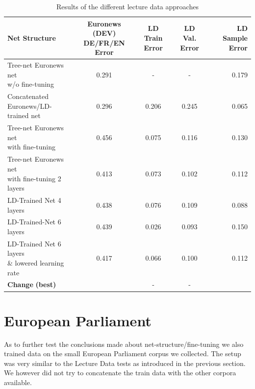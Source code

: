 \begin{table}
\caption{Results of the different lecture data approaches}
\label{tab:resultsLD}
\begin{tabular}{| l | c | c | c | r | }
	\hline
	\textbf{Net Structure} & \parbox[t]{2.5cm}{\textbf{Euronews (DEV)} \\ \textbf{DE/FR/EN Error}} & \parbox[t]{2.5cm}{\textbf{LD} \\ \textbf{Train Error}} & \parbox[t]{2.5cm}{\textbf{LD} \\ \textbf{Val. Error}} & \parbox[t]{2.5cm}{\textbf{LD} \\ \textbf{Sample Error}} \\
	\hline
	\parbox[t]{5cm}{Tree-net Euronews net \\
	 w/o fine-tuning}  & 0.291 & - & - & 0.179 \\
	\hline
	\parbox[t]{5cm}{Concatenated \\ Euronews/LD-trained net } & 0.296 & 0.206 & 0.245 & 0.065 \\
	\hdashline
	\parbox[t]{5cm}{Tree-net Euronews net \\ with fine-tuning } & 0.456 & 0.075 & 0.116 & 0.130 \\
	\hdashline
	\parbox[t]{5cm}{Tree-net Euronews net \\ with fine-tuning 2 layers } & 0.413 & 0.073 & 0.102 & 0.112 \\
	\hdashline
	\parbox[t]{5cm}{LD-Trained Net 4 layers} & 0.438 & 0.076 & 0.109 & 0.088 \\
	\hdashline
	LD-Trained-Net 6 layers & 0.439 & 0.026 & 0.093 & 0.150 \\
	\hdashline
	\parbox[t]{5cm}{LD-Trained Net 6 layers \\ \& lowered learning rate} & 0.417 & 0.066 & 0.100 & 0.112 \\
	\hline
	\parbox[t]{5cm}{\textbf{Change} \textbf{(best)}} &  & - & - &  \\
	\hline
\end{tabular}
\end{table}

\section{European Parliament}
\label{sec:EP}

As to further test the conclusions made about net-structure/fine-tuning we also trained data on the small European Parliament corpus we collected. The setup was very similar to the Lecture Data tests as introduced in the previous section.  We however did not try to concatenate the train data with the other corpora available.

